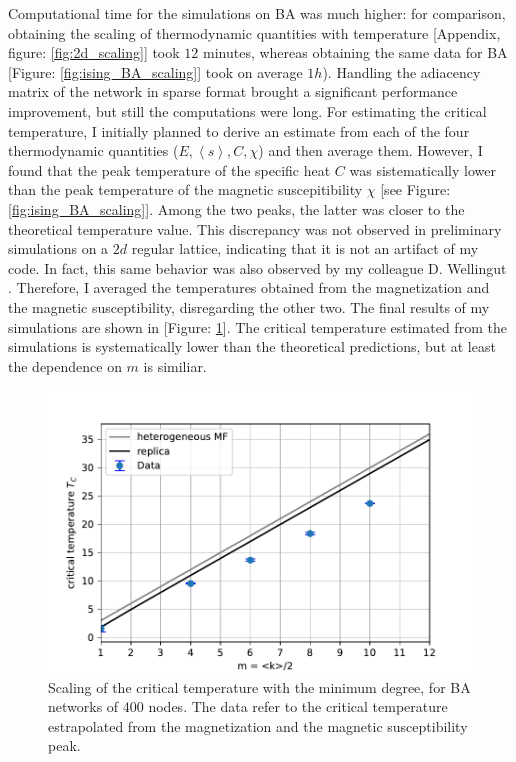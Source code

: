 Computational time for the simulations on BA was much higher: for comparison, obtaining the scaling of thermodynamic quantities with temperature [Appendix, figure: \ref{fig:2d_scaling}] took $12$ minutes, whereas obtaining the same data for BA [Figure: \ref{fig:ising_BA_scaling}] took on average $1h$). Handling the adiacency matrix of the network in sparse format brought a significant performance improvement, but still the computations were long. \medskip \newline \noindent
For estimating the critical temperature, I initially planned to derive an estimate from each of the four thermodynamic quantities ($E, \left\langle s \right\rangle, C, \chi$) and then average them. However, I found that the peak temperature of the specific heat $C$ was sistematically lower than the peak temperature of the magnetic suscepitibility $\chi$ [see Figure: \ref{fig:ising_BA_scaling}]. Among the two peaks, the latter was closer to the theoretical temperature value. This discrepancy was not observed in preliminary simulations on a $2d$ regular lattice, indicating that it is not an artifact of my code. In fact, this same behavior was also observed by my colleague D. Wellingut \cite{dw}. Therefore, I averaged the temperatures obtained from the magnetization and the magnetic susceptibility, disregarding the other two. The final results of my simulations are shown in [Figure: \ref{fig:final_ising}]. The critical temperature estimated from the simulations is systematically lower than the theoretical predictions, but at least the dependence on $m$ is similiar.
\begin{figure}[H]
    \centering
    \includegraphics[width=0.7\linewidth]{latex_source/images/ising/BA_temperatures.pdf}
    \caption{Scaling of the critical temperature with the minimum degree, for BA networks of $400$ nodes. The data refer to the critical temperature estrapolated from the magnetization and the magnetic susceptibility peak.}
    \label{fig:final_ising}
\end{figure}

